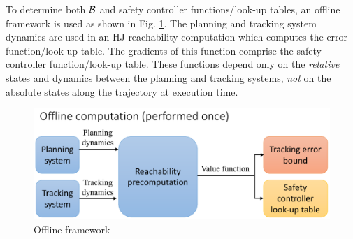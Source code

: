 To determine both $\mathcal B$ and safety controller functions/look-up tables, an offline framework is used as shown in Fig. \ref{fig:fw_offline}. The planning and tracking system dynamics are used in an HJ reachability computation which computes the error function/look-up table. The gradients of this function comprise the safety controller function/look-up table. These functions depend only on the \textit{relative} states and dynamics between the planning and tracking systems, \textit{not} on the absolute states along the trajectory at execution time.

\begin{figure}[]
  \centering
	\includegraphics[width=0.9\columnwidth]{fig/framework_offline}
	\caption{Offline framework}
	\label{fig:fw_offline}
\end{figure}

